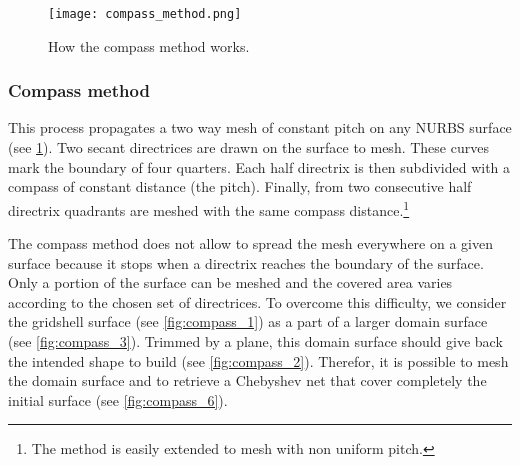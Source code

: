 \begin{figure}[h]
	\centering
	\texttt{[image: compass\_method.png]}
	\caption[How the compass method works]{How the compass method works.}
	\label{fig:compass_method}
\end{figure}

\subsubsection{Compass method}\label{sec:compass}
This process propagates a two way mesh of constant pitch on any NURBS surface (see \cref{fig:compass_method}). Two secant directrices are drawn on the surface to mesh. These curves mark the boundary of four quarters. Each half directrix is then subdivided with a compass of constant distance (the pitch). Finally, from two consecutive half directrix quadrants are meshed with the same compass distance.\footnote{The method is easily extended to mesh with non uniform pitch.}

The compass method does not allow to spread the mesh everywhere on a given surface because it stops when a directrix reaches the boundary of the surface. Only a portion of the surface can be meshed and the covered area varies according to the chosen set of directrices. To overcome this difficulty, we consider the gridshell surface (see \cref{fig:compass_1}) as a part of a larger domain surface (see \cref{fig:compass_3}). Trimmed by a plane, this domain surface should give back the intended shape to build (see \cref{fig:compass_2}). Therefor, it is possible to mesh the domain surface and to retrieve a Chebyshev net that cover completely the initial surface (see \cref{fig:compass_6}).

